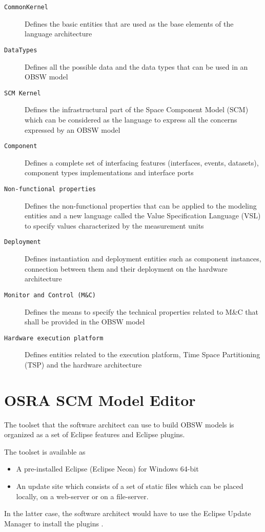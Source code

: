 \begin{description}
\item [\texttt{CommonKernel}] Defines the basic entities that are used as the base elements of the language architecture
\item [\texttt{DataTypes}] Defines all the possible data and the data types that can be used in an OBSW model
\item [\texttt{SCM Kernel}] Defines the infrastructural part of the Space Component Model (SCM) which can be considered as the language to express all the concerns expressed by an OBSW model
\item [\texttt{Component}] Defines a complete set of interfacing features (interfaces, events, datasets), component types implementations and interface ports
\item [\texttt{Non-functional properties}] Defines the non-functional properties that can be applied to the modeling entities and a new language called the Value Specification Language (VSL) to specify values characterized by the measurement units
\item [\texttt{Deployment}] Defines instantiation and deployment entities such as component instances, connection between them and their deployment on the hardware architecture
\item [\texttt{Monitor and Control (M\&C)}] Defines the means to specify the technical properties related to M\&C that shall be provided in the OBSW model
\item [\texttt{Hardware execution platform}] Defines entities related to the execution platform, Time Space Partitioning (TSP) and the hardware architecture   
\end{description}

\section{OSRA SCM Model Editor}
\label{OSRA editor} 
The toolset that the software architect can use to build OBSW models is organized as a set of Eclipse features and Eclipse plugins. 

The toolset is available as
\begin{itemize}
\item A pre-installed Eclipse (Eclipse Neon) for Windows 64-bit  
\item An update site which consists of a set of static files which can be placed locally, on a web-server or on a file-server. 
\end{itemize}
In the latter case, the software architect would have to use the Eclipse Update Manager to install the plugins \cite{OSRAEditor}. 

